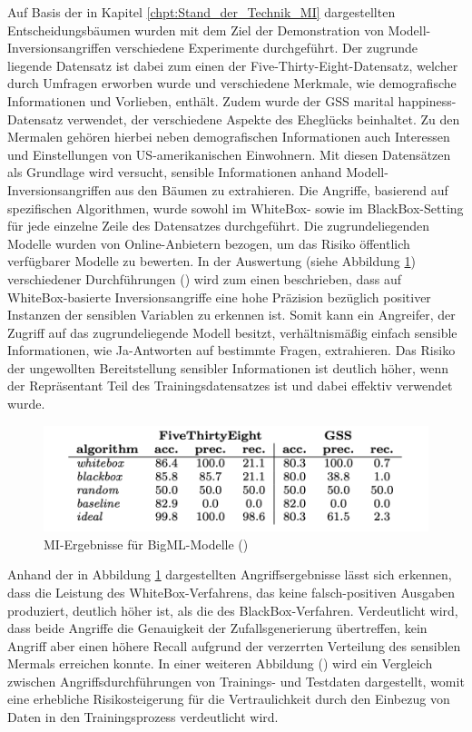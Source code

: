 Auf Basis der in Kapitel \ref{chpt:Stand_der_Technik_MI} dargestellten Entscheidungsbäumen wurden mit dem Ziel der Demonstration von Modell-Inversionsangriffen verschiedene Experimente durchgeführt. Der zugrunde liegende Datensatz ist dabei zum einen der \glqq Five-Thirty-Eight\grqq{}-Datensatz, welcher durch Umfragen erworben wurde und verschiedene Merkmale, wie demografische Informationen und Vorlieben, enthält. Zudem wurde der \glqq GSS marital happiness\grqq{}-Datensatz verwendet, der verschiedene Aspekte des Eheglücks beinhaltet. Zu den Mermalen gehören hierbei neben demografischen Informationen auch Interessen und Einstellungen von US-amerikanischen Einwohnern. Mit diesen Datensätzen als Grundlage wird versucht, sensible Informationen anhand Modell-Inversionsangriffen aus den Bäumen zu extrahieren. Die Angriffe, basierend auf spezifischen Algorithmen, wurde sowohl im WhiteBox- sowie im BlackBox-Setting für jede einzelne Zeile des Datensatzes durchgeführt. Die zugrundeliegenden Modelle wurden von \glqq Online-Anbietern\grqq{} bezogen, um das Risiko öffentlich verfügbarer Modelle zu bewerten. In der Auswertung (siehe Abbildung \ref{img:frederikson_2015_evaluation}) verschiedener Durchführungen (\cite[S. 5 ff.]{fredrikson_model_2015}) wird zum einen beschrieben, dass auf WhiteBox-basierte Inversionsangriffe eine hohe Präzision bezüglich positiver Instanzen der sensiblen Variablen zu erkennen ist. Somit kann ein Angreifer, der Zugriff auf das zugrundeliegende Modell besitzt, verhältnismäßig einfach sensible Informationen, wie \glqq Ja\grqq{}-Antworten auf bestimmte Fragen, extrahieren. Das Risiko der \glqq ungewollten Bereitstellung\grqq{} sensibler Informationen ist deutlich höher, wenn der Repräsentant Teil des Trainingsdatensatzes ist und dabei effektiv verwendet wurde. 
\begin{figure}[H]
	\centering
	\includegraphics[width=0.6\linewidth]{Bilder/frederikson_2015_1.png}
	\caption{MI-Ergebnisse für BigML-Modelle (\cite[S. 6, Figure 4]{fredrikson_model_2015})}
	\label{img:frederikson_2015_evaluation}
\end{figure}
Anhand der in Abbildung \ref{img:frederikson_2015_evaluation} dargestellten Angriffsergebnisse lässt sich erkennen, dass die Leistung des WhiteBox-Verfahrens, das keine falsch-positiven Ausgaben produziert, deutlich höher ist, als die des BlackBox-Verfahren. Verdeutlicht wird, dass beide Angriffe die Genauigkeit der Zufallsgenerierung übertreffen, kein Angriff aber einen höhere Recall aufgrund der verzerrten Verteilung des sensiblen Mermals erreichen konnte. In einer weiteren Abbildung (\cite[S. 7, Figure 5]{fredrikson_model_2015}) wird ein Vergleich zwischen Angriffsdurchführungen von Trainings- und Testdaten dargestellt, womit eine erhebliche Risikosteigerung für die Vertraulichkeit durch den Einbezug von Daten in den Trainingsprozess verdeutlicht wird. 

